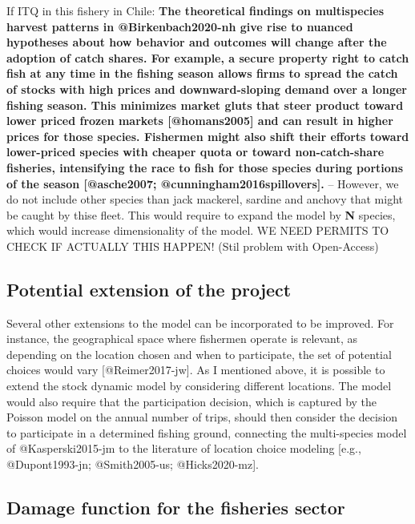 If ITQ in this fishery in Chile: \textbf{The theoretical findings on
multispecies harvest patterns in @Birkenbach2020-nh give rise to nuanced
hypotheses about how behavior and outcomes will change after the
adoption of catch shares. For example, a secure property right to catch
fish at any time in the fishing season allows firms to spread the catch
of stocks with high prices and downward-sloping demand over a longer
fishing season. This minimizes market gluts that steer product toward
lower priced frozen markets {[}@homans2005{]} and can result in higher
prices for those species. Fishermen might also shift their efforts
toward lower-priced species with cheaper quota or toward non-catch-share
fisheries, intensifying the race to fish for those species during
portions of the season {[}@asche2007; @cunningham2016spillovers{]}.} --
However, we do not include other species than jack mackerel, sardine and
anchovy that might be caught by thise fleet. This would require to
expand the model by \textbf{N} species, which would increase
dimensionality of the model. WE NEED PERMITS TO CHECK IF ACTUALLY THIS
HAPPEN! (Stil problem with Open-Access)

\hypertarget{potential-extension-of-the-project}{%
\subsection{Potential extension of the
project}\label{potential-extension-of-the-project}}

Several other extensions to the model can be incorporated to be
improved. For instance, the geographical space where fishermen operate
is relevant, as depending on the location chosen and when to
participate, the set of potential choices would vary
{[}@Reimer2017-jw{]}. As I mentioned above, it is possible to extend the
stock dynamic model by considering different locations. The model would
also require that the participation decision, which is captured by the
Poisson model on the annual number of trips, should then consider the
decision to participate in a determined fishing ground, connecting the
multi-species model of @Kasperski2015-jm to the literature of location
choice modeling {[}e.g., @Dupont1993-jn; @Smith2005-us;
@Hicks2020-mz{]}.

\hypertarget{damage-function-for-the-fisheries-sector}{%
\subsection{Damage function for the fisheries
sector}\label{damage-function-for-the-fisheries-sector}}

